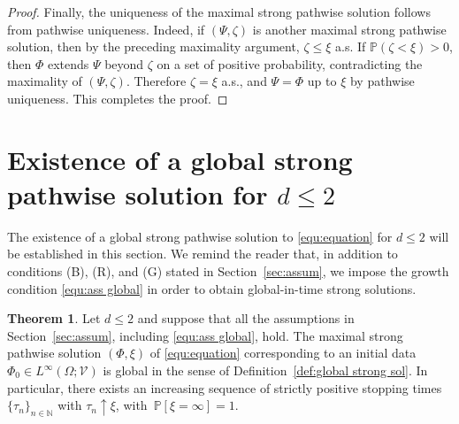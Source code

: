 \documentclass[11pt, reqno]{amsart}
\theoremstyle{definition}
\newtheorem{theorem}{Theorem}[section]
\numberwithin{equation}{section}
\newcommand{\bb}{\mathbb}
\newcommand{\ds}{\mathrm{d}s}
\newcommand{\norm}[1]{\left\|{#1}\right\|}
\newcommand{\one}{\mathds{1}}
\begin{document}
\begin{proof}
	Finally, the uniqueness of the maximal strong pathwise solution follows from
	pathwise uniqueness. Indeed, if $(\Psi,\zeta)$ is another maximal strong
	pathwise solution, then by the preceding maximality argument,
	$\zeta\leq\xi$ a.s. If $\mathbb P(\zeta<\xi)>0$, then $\Phi$ extends
	$\Psi$ beyond $\zeta$ on a set of positive probability, contradicting the
	maximality of $(\Psi,\zeta)$. Therefore $\zeta=\xi$ a.s., and
	$\Psi=\Phi$ up to $\xi$ by pathwise uniqueness. This completes the proof.
\end{proof}





\section{Existence of a global strong pathwise solution for $d\leq 2$}\label{sec:strong}

The existence of a global strong pathwise solution to \eqref{equ:equation} for $d\leq 2$ will be established in this section. We remind the reader that, in addition to conditions (B), (R), and (G) stated in Section~\ref{sec:assum}, we impose the growth condition \eqref{equ:ass global} in order to obtain global-in-time strong solutions.

\begin{theorem}\label{the:global strong 2d}
Let $d\leq 2$ and suppose that all the assumptions in Section~\ref{sec:assum}, including \eqref{equ:ass global}, hold. The maximal strong pathwise solution $(\Phi, \xi)$ of \eqref{equ:equation} corresponding to an initial data $\Phi_0\in L^\infty(\Omega;\mathcal{V})$ is global in the sense of Definition~\ref{def:global strong sol}. In particular, there exists an increasing sequence of strictly positive stopping times $\{\tau_n\}_{n\in\bb{N}}$ with $\tau_n\uparrow \xi$, with~$\bb{P}\left[\xi=\infty\right]=1$. 
\end{theorem}
\end{document}
